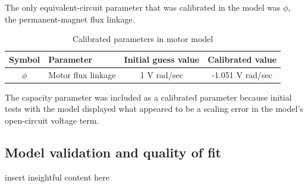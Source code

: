\documentclass[../SimBALink.tex]{subfiles}
\begin{document}
			The only equivalent-circuit parameter that was calibrated in the model was $\phi$, the permanent-magnet flux linkage.
						
			\begin{table}
				\centering
				\caption{Calibrated parameters in motor model}
				\label{table:motor_calibrated_parameters}
				\begin{tabular}{c | l | c | c}
					Symbol		&	Parameter			&	Initial guess value	&	Calibrated value	\\
					\hline
					$\phi$		&	Motor flux linkage		&	1 V rad/sec	 	&	-1.051 V rad/sec
				\end{tabular}
			\end{table}
			
			The capacity parameter was included as a calibrated parameter because initial tests with the model displayed what appeared to be a scaling error in the model's open-circuit voltage term.
			
	\subsection{Model validation and quality of fit}
		insert insightful content here
		
		
\end{document}
